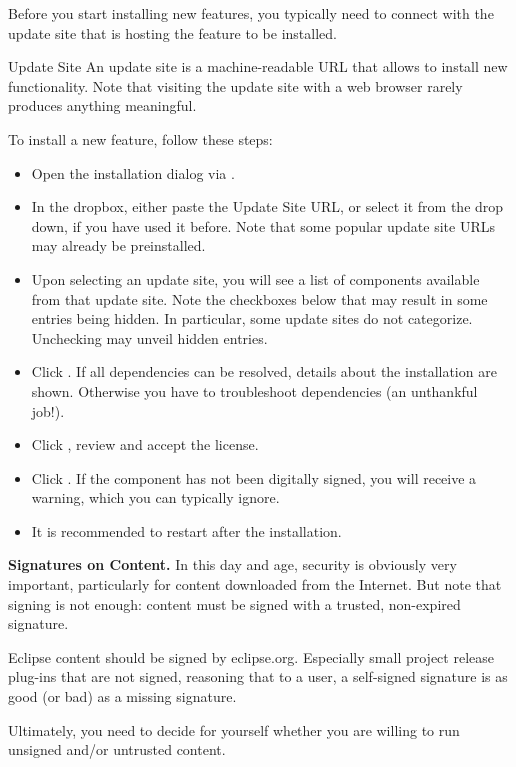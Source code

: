 Before you start installing new features, you typically need to connect with the update site that is hosting the feature to be installed.

\begin{definition}{Update Site}
An update site is a machine-readable URL that allows \pror{} to install new functionality.  Note that visiting the update site with a web browser rarely produces anything meaningful.
\end{definition}

To install a new feature, follow these steps:

\begin{itemize}
\item Open the installation dialog via .
\item In the  dropbox, either paste the Update Site URL, or select it from the drop down, if you have used it before.  Note that some popular update site URLs may already be preinstalled.
\item Upon selecting an update site, you will see a list of components available from that update site.  Note the checkboxes below that may result in some entries being hidden.  In particular, some update sites do not categorize.  Unchecking  may unveil hidden entries.
\item Click .  If all dependencies can be resolved, details about the installation are shown.  Otherwise you have to troubleshoot dependencies (an unthankful job!).
\item Click , review and accept the license.
\item Click .  If the component has not been digitally signed, you will receive a warning, which you can typically ignore.
\item It is recommended to restart after the installation.
\end{itemize}

\begin{info}
\textbf{Signatures on Content.}  In this day and age, security is obviously very important, particularly for content downloaded from the Internet.  But note that signing is not enough: content must be signed with a trusted, non-expired signature.

Eclipse content should be signed by eclipse.org.  Especially small project release plug-ins that are not signed, reasoning that to a user, a self-signed signature is as good (or bad) as a missing signature.

Ultimately, you need to decide for yourself whether you are willing to run unsigned and/or untrusted content.
\end{info}

